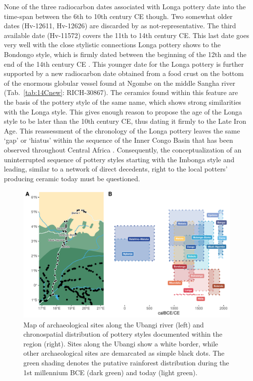 \documentclass[smallextended,natbib]{svjour3}       %
\begin{document}
None of the three radiocarbon dates associated with Longa pottery date into the time-span between the 6th to 10th century CE though. Two somewhat older dates (Hv-12611, Hv-12626) are discarded by \citet[127--128 Tab. 53]{Wotzka.1995} as not-representative. The third available date (Hv-11572) covers the 11th to 14th century CE. This last date goes very well with the close stylistic connections Longa pottery shows to the Bondongo style, which is firmly dated between the beginning of the 12th and the end of the 14th century CE \citep[Fig.~\ref{fig:chrono}; S1; Tab.~S1;][138 Tab.~58]{Wotzka.1995}. This younger date for the Longa pottery is further supported by a new radiocarbon date obtained from a food crust on the bottom of the enormous globular vessel found at Ngombe on the middle Sangha river (Tab.~\ref{tab:14Cnew}: RICH-30867). The ceramics found within this feature are the basis of the pottery style of the same name, which shows strong similarities with the Longa style. This gives enough reason to propose the age of the Longa style to be later than the 10th century CE, thus dating it firmly to the Late Iron Age. This reassessment of the chronology of the Longa pottery leaves the same ‘gap’ or ‘hiatus’ within the sequence of the Inner Congo Basin that has been observed throughout Central Africa \citep{deSaulieu.2021a,Seidensticker.2021}. Consequently, the conceptualization of an uninterrupted sequence of pottery styles starting with the Imbonga style and leading, similar to a network of direct decedents, right to the local potters’ producing ceramic today \citep[65, 221, 274, 285]{Wotzka.1995} must be questioned.

\begin{figure}[!tbp]
	\centering
	\includegraphics[width=\textwidth]{fig_ubangi_chrono.pdf}
	\caption{Map of archaeological sites along the Ubangi river (left) and chronospatial distribution of pottery styles documented within the region (right). Sites along the Ubangi show a white border, while other archaeological sites are demarcated as simple black dots. The green shading denotes the putative rainforest distribution during the 1st millennium BCE \citep{Bremond.2017,Maley.2017} (dark green) and today \citep{White.1983} (light green).}
	\label{fig:ubangi.chrono}
\end{figure}
\end{document}
